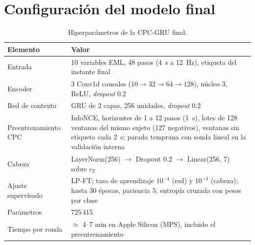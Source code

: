 \documentclass[letterpaper,11pt]{article}
\begin{document}
\section{Configuración del modelo final}
\label{anx:config}
\begin{table}[H]
  \centering
  \small
  \caption{Hiperparámetros de la CPC-GRU final.}
  \begin{tabular}{p{4.5cm}p{9.8cm}}
    \toprule
    Elemento & Valor \\
    \midrule
    Entrada & 10 variables EML, 48 pasos (4~s a 12~Hz), etiqueta del instante final \\
    Encoder & 3 Conv1d causales ($10 \to 32 \to 64 \to 128$), núcleo 3, ReLU, \emph{dropout} 0.2 \\
    Red de contexto & GRU de 2 capas, 256 unidades, \emph{dropout} 0.2 \\
    Preentrenamiento CPC & InfoNCE, horizontes de 1 a 12 pasos (1~s), lotes de 128 ventanas del mismo sujeto (127 negativos), ventanas sin etiqueta cada 2~s; parada temprana con sonda lineal en la validación interna \\
    Cabeza & LayerNorm(256) $\to$ Dropout 0.2 $\to$ Linear(256, 7) sobre $c_T$ \\
    Ajuste supervisado & LP-FT; tasa de aprendizaje $10^{-4}$ (red) y $10^{-3}$ (cabeza); hasta 30 épocas, paciencia 5; entropía cruzada con pesos por clase \\
    Parámetros & 725\,415 \\
    Tiempo por ronda & $\approx$ 4--7 min en Apple Silicon (MPS), incluido el preentrenamiento \\
    \bottomrule
  \end{tabular}
\end{table}
\end{document}
